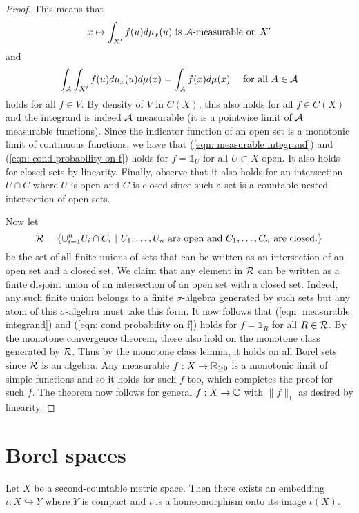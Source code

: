 \documentclass[twoside, a4paper, 10pt]{amsart}
\begin{document}
\begin{proof}
This means that \begin{align}\label{eqn: measurable integrand} x \mapsto \int_{X'} f(u) d\mu_x(u) \text{ is $\mathcal{A}$-measurable on $X'$} \end{align} and \begin{align}\label{eqn: cond probability on f} \int_{A} \int_{X'} f(u) d\mu_x(u) d\mu(x) = \int_A f(x) d\mu(x) \quad\text{ for all } A \in \mathcal{A} \end{align} holds for all $f \in V$. By density of $V$ in $C(X)$, this also holds for all $f \in C(X)$ and the integrand is indeed $\mathcal{A}$ measurable (it is a pointwise limit of $\mathcal{A}$ measurable functions). Since the indicator function of an open set is a monotonic limit of continuous functions, we have that (\ref{eqn: measurable integrand}) and (\ref{eqn: cond probability on f}) holds for $f = \mathds{1}_U$ for all $U \subset X$ open. It also holds for closed sets by linearity. Finally, observe that it also holds for an intersection $U \cap C$ where $U$ is open and $C$ is closed since such a set is a countable nested intersection of open sets.

Now let $$\mathcal{R} = \{ \cup_{i=1}^n U_i \cap C_i ~|~ U_1, \ldots, U_n \text{ are open and } C_1, \ldots, C_n \text{ are closed.} \}$$ be the set of all finite unions of sets that can be written as an intersection of an open set and a closed set. We claim that any element in $\mathcal{R}$ can be written as a finite disjoint union of an intersection of an open set with a closed set. Indeed, any such finite union belongs to a finite $\sigma$-algebra generated by such sets but any atom of this $\sigma$-algebra must take this form. It now follows that  (\ref{eqn: measurable integrand}) and (\ref{eqn: cond probability on f}) holds for $f = \mathds{1}_R$ for all $R \in \mathcal{R}$. By the monotone convergence theorem, these also hold on the monotone class generated by $\mathcal{R}$. Thus by the monotone class lemma, it holds on all Borel sets since $\mathcal{R}$ is an algebra. Any measurable $f:X \to \mathbb{R}_{\geq 0}$ is a monotonic limit of simple functions and so it holds for such $f$ too, which completes the proof for such $f$. The theorem now follows for general $f:X \to \mathbb{C}$ with $\|f\|_1$ as desired by linearity. \end{proof}

\section{Borel spaces}

\begin{lemma} Let $X$ be a second-countable metric space. Then there exists an embedding $\iota:X \hookrightarrow Y$ where $Y$ is compact and $\iota$ is a homeomorphism onto its image $\iota(X)$.

\end{lemma}
\end{document}
